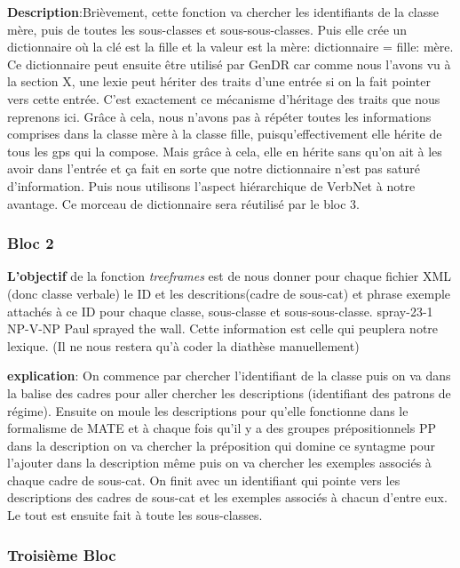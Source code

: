 \textbf{Description}:Brièvement, cette fonction va chercher les identifiants de la classe mère, puis de toutes les sous-classes et sous-sous-classes. Puis elle crée un dictionnaire où la clé est la fille et la valeur est la mère: dictionnaire = {fille: mère}. Ce dictionnaire peut ensuite être utilisé par GenDR car comme nous l'avons vu à la section X, une lexie peut hériter des traits d'une entrée si on la fait pointer vers cette entrée. C'est exactement ce mécanisme d'héritage des traits que nous reprenons ici. Grâce à cela, nous n'avons pas à répéter toutes les informations comprises dans la classe mère à la classe fille, puisqu'effectivement elle hérite de tous les gps qui la compose. Mais grâce à cela, elle en hérite sans qu'on ait à les avoir dans l'entrée et ça fait en sorte que notre dictionnaire n'est pas saturé d'information. Puis nous utilisons l'aspect hiérarchique de VerbNet à notre avantage. Ce morceau de dictionnaire sera réutilisé par le bloc 3.

\subsubsection{Bloc 2}
\textbf{L'objectif} de la fonction \emph{treeframes} est de nous donner pour chaque fichier XML (donc classe verbale) le ID et les descritions(cadre de sous-cat) et phrase exemple attachés à ce ID pour chaque classe, sous-classe et sous-sous-classe. spray-23-1 NP-V-NP Paul sprayed the wall. Cette information est celle qui peuplera notre lexique. (Il ne nous restera qu'à coder la diathèse manuellement)

\textbf{explication}: On commence par chercher l'identifiant de la classe puis on va dans la balise des cadres pour aller chercher les descriptions (identifiant des patrons de régime). Ensuite on moule les descriptions pour qu'elle fonctionne dans le formalisme de MATE et à chaque fois qu'il y a des groupes prépositionnels PP dans la description on va chercher la préposition qui domine ce syntagme pour l'ajouter dans la description même  puis on va chercher les exemples associés à chaque cadre de sous-cat. On finit avec un identifiant qui pointe vers les descriptions des cadres de sous-cat et les exemples associés à chacun d'entre eux. Le tout est ensuite fait à toute les sous-classes.

\subsubsection{Troisième Bloc}

